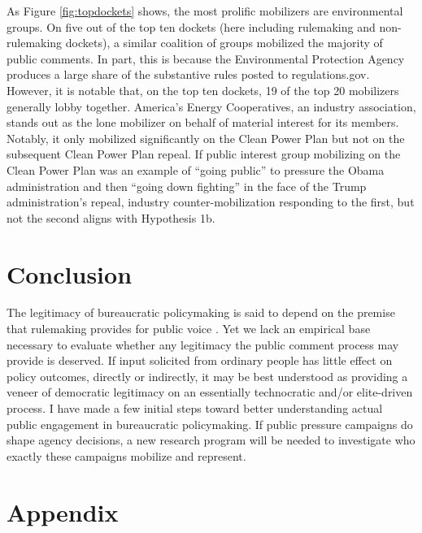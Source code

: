 \documentclass[
      12pt,
        ]{article}
\begin{document}
As Figure \ref{fig:topdockets} shows, the most prolific mobilizers are
environmental groups. On five out of the top ten dockets (here including
rulemaking and non-rulemaking dockets), a similar coalition of groups
mobilized the majority of public comments. In part, this is because the
Environmental Protection Agency produces a large share of the
substantive rules posted to regulations.gov. However, it is notable
that, on the top ten dockets, 19 of the top 20 mobilizers generally
lobby together. America's Energy Cooperatives, an industry association,
stands out as the lone mobilizer on behalf of material interest for its
members. Notably, it only mobilized significantly on the Clean Power
Plan but not on the subsequent Clean Power Plan repeal. If public
interest group mobilizing on the Clean Power Plan was an example of
``going public'' to pressure the Obama administration and then ``going
down fighting'' in the face of the Trump administration's repeal,
industry counter-mobilization responding to the first, but not the
second aligns with Hypothesis 1b.

\hypertarget{conclusion}{%
\section{Conclusion}\label{conclusion}}

The legitimacy of bureaucratic policymaking is said to depend on the premise that rulemaking provides for public voice \citep[\citet{Rosenbloom2003}]{Croley2003}. Yet we lack an empirical base necessary to evaluate whether any legitimacy the public comment process may provide is deserved. If input solicited from ordinary people has little effect on policy outcomes, directly or indirectly, it may be best understood as providing a veneer of democratic legitimacy on an essentially technocratic and/or elite-driven process. I have made a few initial steps toward better understanding actual public engagement in bureaucratic policymaking.
If public pressure campaigns do shape agency decisions, a new research program will be needed to investigate who exactly these campaigns mobilize and represent.

\newpage

\hypertarget{appendix-appendix}{%
\appendix}


\hypertarget{appendix}{%
\section*{Appendix}\label{appendix}}
\end{document}
